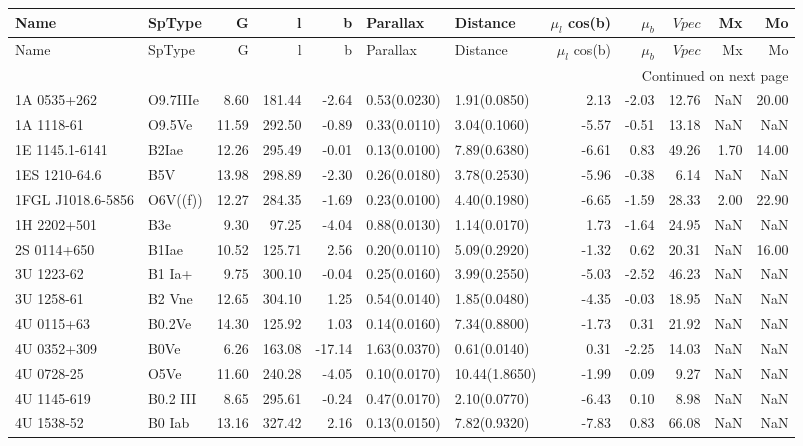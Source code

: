 \begin{longtable}{llrrrllrrrrr}
\toprule
Name & SpType & G & l & b & Parallax & Distance & $\mu_l$ cos(b) & $\mu_b$ & $V pec$ & Mx & Mo \\
\midrule
\endfirsthead
\toprule
Name & SpType & G & l & b & Parallax & Distance & $\mu_l$ cos(b) & $\mu_b$ & $V pec$ & Mx & Mo \\
\midrule
\endhead
\midrule
\multicolumn{12}{r}{Continued on next page} \\
\midrule
\endfoot
\bottomrule
\endlastfoot
1A 0535+262 & O9.7IIIe & 8.60 & 181.44 & -2.64 & 0.53(0.0230) & 1.91(0.0850) & 2.13 & -2.03 & 12.76 & NaN & 20.00 \\
1A 1118-61 & O9.5Ve & 11.59 & 292.50 & -0.89 & 0.33(0.0110) & 3.04(0.1060) & -5.57 & -0.51 & 13.18 & NaN & NaN \\
1E 1145.1-6141 & B2Iae & 12.26 & 295.49 & -0.01 & 0.13(0.0100) & 7.89(0.6380) & -6.61 & 0.83 & 49.26 & 1.70 & 14.00 \\
1ES 1210-64.6 & B5V & 13.98 & 298.89 & -2.30 & 0.26(0.0180) & 3.78(0.2530) & -5.96 & -0.38 & 6.14 & NaN & NaN \\
1FGL J1018.6-5856 & O6V((f)) & 12.27 & 284.35 & -1.69 & 0.23(0.0100) & 4.40(0.1980) & -6.65 & -1.59 & 28.33 & 2.00 & 22.90 \\
1H 2202+501 & B3e & 9.30 & 97.25 & -4.04 & 0.88(0.0130) & 1.14(0.0170) & 1.73 & -1.64 & 24.95 & NaN & NaN \\
2S 0114+650 & B1Iae & 10.52 & 125.71 & 2.56 & 0.20(0.0110) & 5.09(0.2920) & -1.32 & 0.62 & 20.31 & NaN & 16.00 \\
3U 1223-62 & B1 Ia+ & 9.75 & 300.10 & -0.04 & 0.25(0.0160) & 3.99(0.2550) & -5.03 & -2.52 & 46.23 & NaN & NaN \\
3U 1258-61 & B2 Vne & 12.65 & 304.10 & 1.25 & 0.54(0.0140) & 1.85(0.0480) & -4.35 & -0.03 & 18.95 & NaN & NaN \\
4U 0115+63 & B0.2Ve & 14.30 & 125.92 & 1.03 & 0.14(0.0160) & 7.34(0.8800) & -1.73 & 0.31 & 21.92 & NaN & NaN \\
4U 0352+309 & B0Ve & 6.26 & 163.08 & -17.14 & 1.63(0.0370) & 0.61(0.0140) & 0.31 & -2.25 & 14.03 & NaN & NaN \\
4U 0728-25 & O5Ve & 11.60 & 240.28 & -4.05 & 0.10(0.0170) & 10.44(1.8650) & -1.99 & 0.09 & 9.27 & NaN & NaN \\
4U 1145-619 & B0.2 III & 8.65 & 295.61 & -0.24 & 0.47(0.0170) & 2.10(0.0770) & -6.43 & 0.10 & 8.98 & NaN & NaN \\
4U 1538-52 & B0 Iab & 13.16 & 327.42 & 2.16 & 0.13(0.0150) & 7.82(0.9320) & -7.83 & 0.83 & 66.08 & NaN & NaN \\

\end{longtable}
